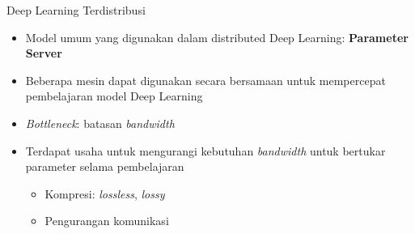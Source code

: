 \begin{frame}{Deep Learning Terdistribusi}
  \begin{itemize}
    \item Model umum yang digunakan dalam distributed Deep Learning: \textbf{Parameter Server}
    \item Beberapa mesin dapat digunakan secara bersamaan untuk mempercepat pembelajaran model Deep Learning
    \item \textit{Bottleneck}: batasan \textit{bandwidth}
    \item Terdapat usaha untuk mengurangi kebutuhan \textit{bandwidth} untuk bertukar parameter selama pembelajaran
          \begin{itemize}
            \item Kompresi: \textit{lossless}, \textit{lossy}
            \item Pengurangan komunikasi
          \end{itemize}
  \end{itemize}
\end{frame}
